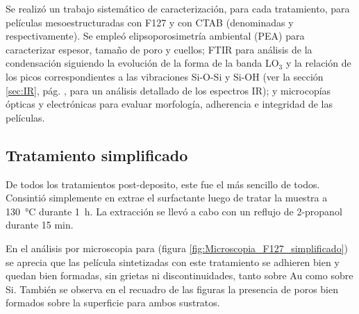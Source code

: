 		Se realizó un trabajo sistemático de caracterización, para cada tratamiento, para películas mesoestructuradas con F127 y con CTAB (denominadas \pdmF\space y \pdmC\space respectivamente). Se empleó elipsoporosimetría ambiental (PEA) para caracterizar espesor, tamaño de poro y cuellos; FTIR para análisis de la condensación siguiendo la evolución de la forma de la banda LO$_3$ y la relación de los picos correspondientes a las vibraciones Si-O-Si y Si-OH (ver la sección \ref{sec:IR}, pág. \pageref{sec:IR}, para un análisis detallado de los espectros IR); y microcopías ópticas y electrónicas para evaluar morfología, adherencia e integridad de las películas.

	\subsection{Tratamiento simplificado}

		De todos los tratamientos post-deposito, este fue el más sencillo de todos. Consintió simplemente en extrae el surfactante luego de tratar la muestra a \SI{130}{\celsius} durante \SI{1}{\hour}. La extracción se llevó a cabo con un reflujo de 2-propanol durante 15 min. 
		
		En el análisis por microscopia para \pdmF\space (figura \ref{fig:Microscopia_F127_simplificado}) se aprecia que las película sintetizadas con este tratamiento se adhieren bien y quedan bien formadas, sin grietas ni discontinuidades, tanto sobre Au como sobre Si. También se observa en el recuadro de las figuras  la presencia de poros bien formados sobre la superficie para ambos sustratos.
			
